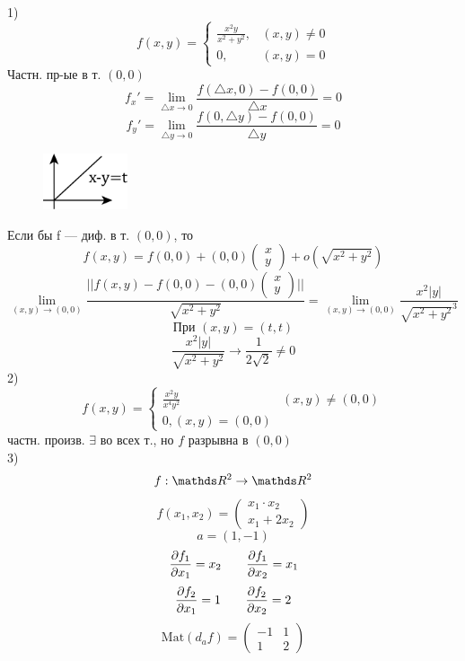 \documentclass[main]{subfiles}
\begin{document}
	\begin{examples}
		1)
		\[f(x, y) = \begin{cases}
				\frac{x^2 y}{x^2 + y^2}, & (x, y) \neq 0 \\
				0,                       & (x, y) = 0
			\end{cases}\]
		Частн. пр-ые в т. $(0, 0)$
		\[f_x' = \lim_{\triangle x \to 0} \frac{f(\triangle x, 0) - f(0, 0)}{\triangle x} = 0 \]
		\[f_y' = \lim_{\triangle y \to 0} \frac{f(0, \triangle y) - f(0, 0)}{\triangle y} = 0\]
		\begin{figure}[H]
			\includegraphics[width = 2.5cm]{pics/4_1}
			\centering
		\end{figure}
		Если бы f --- диф. в т. $(0, 0)$, то
		\[f(x, y) = f(0, 0) + (0, 0) \begin{pmatrix}
				x \\
				y
			\end{pmatrix}
			+ o(\sqrt{x^2 + y^2})
		\]
		\[\lim_{(x, y) \to (0, 0)} \frac{||f(x, y) - f(0, 0) - (0, 0) \begin{pmatrix}
					x \\
					y
				\end{pmatrix}||}{\sqrt{x^2 + y^2}} =
			\lim_{(x, y) \to (0, 0)} \frac{x^2|y|}{ \sqrt{x^2 + y^2}^3} \]
		\[\text{При } (x, y) = (t, t)\]
		\[\frac{x^2|y|}{\sqrt{x^2 + y^2}} \to \frac{1}{2\sqrt{2}} \neq 0\]
		2)
		\[f(x, y) = \begin{cases}
				\frac{x^2 y}{x^4 y^2} & (x, y) \neq (0, 0) \\
				0 , (x, y) = (0, 0)
			\end{cases}\]
		частн. произв. $\exists$ во всех т., но $f$ разрывна в $(0, 0)$\\
		3)
		\[f: \R^2 \to \R^2\]
		\[f(x_1, x_2) = \begin{pmatrix}
				x_1 \cdot x_2 \\
				x_1 + 2x_2
			\end{pmatrix}\]
		\[a = (1, -1)\]
		\[\frac{\partial f_1}{\partial x_1} = x_2 \quad\quad \frac{\partial f_1}{\partial x_2} = x_1\]
		\[\frac{\partial f_2}{\partial x_1} = 1 \quad\quad \frac{\partial f_2}{\partial x_2} = 2\]
		\[\text{Mat}(d_a f) = \begin{pmatrix}
				-1 & 1 \\
				1  & 2
			\end{pmatrix}\]

\end{examples}
\end{document}
